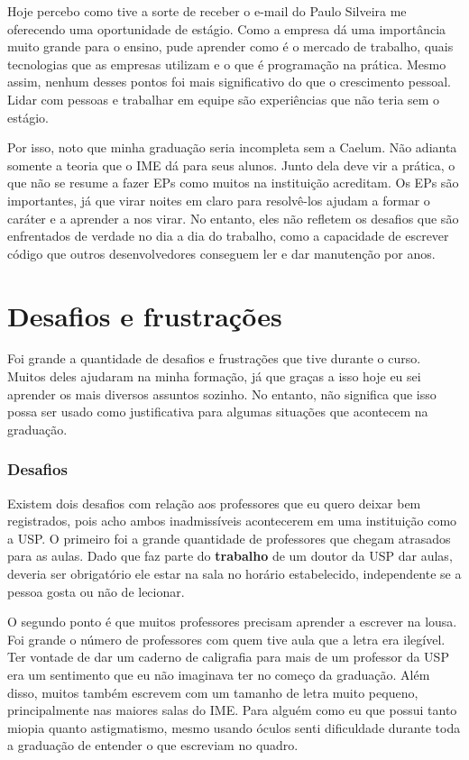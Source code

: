 \documentclass[titlepage,a4paper]{article}
\begin{document}
Hoje percebo como tive a sorte de receber o e-mail do Paulo Silveira me oferecendo uma oportunidade de estágio. Como a empresa dá uma importância muito grande para o ensino, pude aprender como é o mercado de trabalho, quais tecnologias que as empresas utilizam e o que é programação na prática. Mesmo assim, nenhum desses pontos foi mais significativo do que o crescimento pessoal. Lidar com pessoas e trabalhar em equipe são experiências que não teria sem o estágio.

Por isso, noto que minha graduação seria incompleta sem a Caelum. Não adianta somente a teoria que o IME dá para seus alunos. Junto dela deve vir a prática, o que não se resume a fazer EPs como muitos na instituição acreditam. Os EPs são importantes, já que virar noites em claro para resolvê-los ajudam a formar o caráter e a aprender a nos virar. No entanto, eles não refletem os desafios que são enfrentados de verdade no dia a dia do trabalho, como a capacidade de escrever código que outros desenvolvedores conseguem ler e dar manutenção por anos.

\section{Desafios e frustrações}

Foi grande a quantidade de desafios e frustrações que tive durante o curso. Muitos deles ajudaram na minha formação, já que graças a isso hoje eu sei aprender os mais diversos assuntos sozinho. No entanto, não significa que isso possa ser usado como justificativa para algumas situações que acontecem na graduação.

\subsubsection*{Desafios}

Existem dois desafios com relação aos professores que eu quero deixar bem registrados, pois acho ambos inadmissíveis acontecerem em uma instituição como a USP. O primeiro foi a grande quantidade de professores que chegam atrasados para as aulas. Dado que faz parte do \textbf{trabalho} de um doutor da USP dar aulas, deveria ser obrigatório ele estar na sala no horário estabelecido, independente se a pessoa gosta ou não de lecionar.

O segundo ponto é que muitos professores precisam aprender a escrever na lousa. Foi grande o número de professores com quem tive aula que a letra era ilegível. Ter vontade de dar um caderno de caligrafia para mais de um professor da USP era um sentimento que eu não imaginava ter no começo da graduação. Além disso, muitos também escrevem com um tamanho de letra muito pequeno, principalmente nas maiores salas do IME. Para alguém como eu que possui tanto miopia quanto astigmatismo, mesmo usando óculos senti dificuldade durante toda a graduação de entender o que escreviam no quadro.
\end{document}
